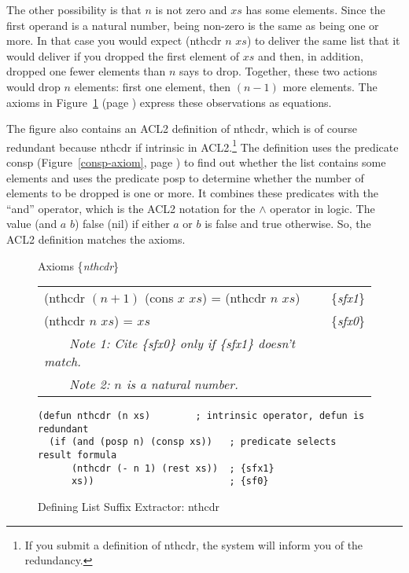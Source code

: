 The other possibility is that $n$ is not zero and $xs$ has some elements.
Since the first operand is a natural number,
being non-zero is the same as being one or more.
In that case you would expect (nthcdr $n$ $xs$) to deliver
the same list that it would deliver
if you dropped the first element of $xs$
and then, in addition, dropped one fewer elements than $n$ says to drop.
Together, these two actions would drop $n$ elements:
first one element, then $(n - 1)$ more elements.
The axioms in Figure~\ref{fig:nthcdr-defun} (page \pageref{fig:nthcdr-defun})
express these observations as equations.

The figure also contains an ACL2 definition of nthcdr, which
is of course redundant because nthcdr if intrinsic in ACL2.\footnote{If
you submit a definition of nthcdr,
the system will inform you of the redundancy.}
The definition uses the predicate consp
(Figure~\ref{consp-axiom}, page \pageref{consp-axiom})
to find out whether the list contains some elements and
uses the predicate
\label{posp-def} posp
to determine whether
the number of elements to be dropped is one or more.
It combines these predicates with the ``and'' operator,
which is the ACL2 notation for the $\wedge$ operator in logic.
\label{and-op=informal}
The value (and $a$ $b$) false (nil)
if either $a$ or $b$ is false and true otherwise.
So, the ACL2 definition matches the axioms.


\begin{figure}
\begin{center}
Axioms \{\emph{nthcdr}\} \\
\begin{tabular}{ll}
(nthcdr $(n+1)$ (cons $x$ $xs$) = (nthcdr $n$ $xs$) & \{\emph{sfx1}\}   \\
(nthcdr $n$ $xs$) = $xs$                            & \{\emph{sfx0}\}   \\
~~~~\emph{Note 1: Cite \{\emph{sfx0}\} only if \{\emph{sfx1}\} doesn't match.}&\\
~~~~\emph{Note 2: $n$ is a natural number.}
\end{tabular}
\begin{Verbatim}
(defun nthcdr (n xs)        ; intrinsic operator, defun is redundant
  (if (and (posp n) (consp xs))   ; predicate selects result formula
      (nthcdr (- n 1) (rest xs))  ; {sfx1}
      xs))                        ; {sf0}
\end{Verbatim}
\end{center}
\caption{Defining List Suffix Extractor: nthcdr}
\label{fig:nthcdr-defun}
\end{figure}

